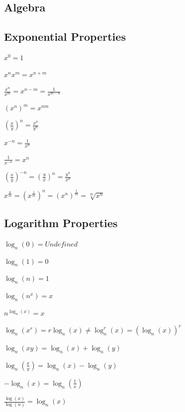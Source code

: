 \documentclass[8pt,a4paper]{extarticle}     %
\theoremstyle{definition}
\theoremstyle{definition}
\theoremstyle{definition}
\begin{document}
\begin{multicols}{4}
\setcounter{page}{1}

\section{Algebra}
\subsection{Exponential Properties}
\begin{eqlist}
	\item $x^0 = 1$
	\item $x^nx^m = x^{n+m}$
	\item $\frac{x^n}{x^m} = x^{n-m} = \frac{1}{x^{m-n}}$
	\item $(x^n)^m = x^{nm}$
	\item $\left(\frac{x}{y}\right)^n = \frac{x^n}{y^n}$
	\item $x^{-n} = \frac{1}{x^n}$
	\item $\frac{1}{x^{-n}} = x^n$
	\item $\left(\frac{x}{y}\right)^{-n} = \left(\frac{y}{x}\right)^n = \frac{y^n}{x^n}$
	\item $x^{\frac{n}{m}} = \left(x^{\frac{1}{m}}\right)^n = (x^n)^{\frac{1}{m}} = \sqrt[m]{x^n}$
\end{eqlist}

\subsection{Logarithm Properties}
\begin{eqlist}
	\item $\log_n(0) = \textit{Undefined}$
	\item $\log_n(1) = 0$
	\item $\log_n(n) = 1$
	\item $\log_n(n^x) = x$
	\item $n^{\log_n(x)} = x$
	\item $\log_n(x^r) = r\log_n(x) \neq \log_n^r(x) = (\log_n(x))^r$
	\item $\log_n(xy) = \log_n(x) + \log_n(y)$
	\item $\log_n\left(\frac{x}{y}\right) = \log_n(x) - \log_n(y)$
	\item $-\log_n(x) = \log_n\left(\frac{1}{x}\right)$
	\item $\frac{\log(x)}{\log(n)} = \log_n(x)$
\end{eqlist}


\end{multicols}
\end{document}
